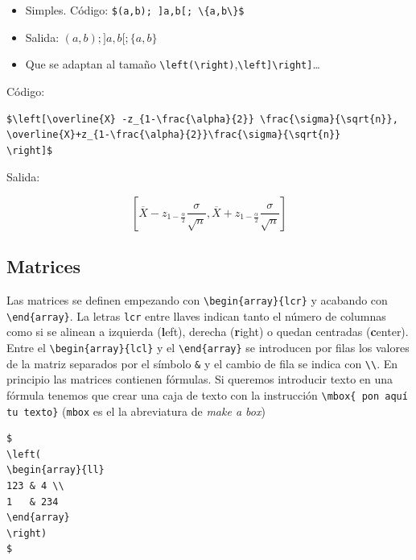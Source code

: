 \documentclass[]{article}
\begin{document}
\begin{itemize}
\itemsep1pt\parskip0pt
\item
  Simples. Código:
  \texttt{\$(a,b); {]}a,b{[}; \textbackslash{}\{a,b\textbackslash{}\}\$}
\item
  Salida: $(a,b); ]a,b[; \{a,b\}$
\item
  Que se adaptan al tamaño
  \texttt{\textbackslash{}left(\textbackslash{}right)},\texttt{\textbackslash{}left{]}\textbackslash{}right{]}}\ldots{}
\end{itemize}

Código:

\begin{verbatim}
$\left[\overline{X} -z_{1-\frac{\alpha}{2}} \frac{\sigma}{\sqrt{n}}, \overline{X}+z_{1-\frac{\alpha}{2}}\frac{\sigma}{\sqrt{n}}
\right]$
\end{verbatim}

Salida:

\[\left[\overline{X} -z_{1-\frac{\alpha}{2}} \frac{\sigma}{\sqrt{n}}, \overline{X}+z_{1-\frac{\alpha}{2}}\frac{\sigma}{\sqrt{n}}
\right]\]

\subsection{Matrices }\label{matrices}

Las matrices se definen empezando con
\texttt{\textbackslash{}begin\{array\}\{lcr\}} y acabando con
\texttt{\textbackslash{}end\{array\}}. La letras \texttt{lcr} entre
llaves indican tanto el número de columnas como si se alinean a
izquierda (\textbf{l}eft), derecha (\textbf{r}ight) o quedan centradas
(\textbf{c}enter). Entre el
\texttt{\textbackslash{}begin\{array\}\{lcl\}} y el
\texttt{\textbackslash{}end\{array\}} se introducen por filas los
valores de la matriz separados por el símbolo \texttt{\&} y el cambio de
fila se indica con \texttt{\textbackslash{}\textbackslash{}}. En
principio las matrices contienen fórmulas. Si queremos introducir texto
en una fórmula tenemos que crear una caja de texto con la instrucción
\texttt{\textbackslash{}mbox\{ pon aquí tu texto\}} (\texttt{mbox} es el
la abreviatura de \emph{make a box})

\begin{verbatim}
$
\left(
\begin{array}{ll}
123 & 4 \\
1   & 234
\end{array}
\right)
$
\end{verbatim}
\end{document}
